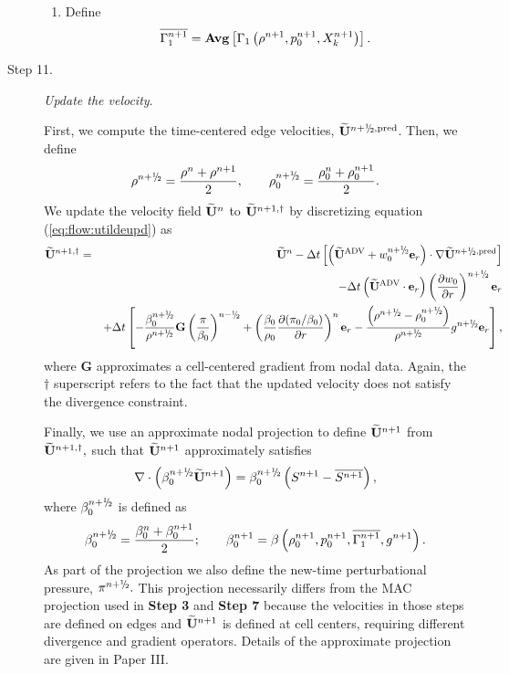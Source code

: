 \begin{description}
\begin{enumerate}
\item Define
\begin{equation}
\overline{\Gamma_1^{n+1}} = {\rm{\bf Avg}}\left[\Gamma_1\left(\rho^{n+1}, p_0^{n+1}, 
X_k^{n+1}\right) \right].
\end{equation}

\end{enumerate}


\item[Step 11.] {\em Update the velocity}.  

First, we compute the time-centered edge velocities, $\Ubt^{\nph,\pred}$.
Then, we define
\begin{equation}
\rho^\nph = \frac{\rho^n + \rho^{n+1}}{2}, \qquad \rho_0^\nph = \frac{\rho_0^n + \rho_0^{n+1}}{2}.
\end{equation}
We update the velocity field $\widetilde{{\bf U}}^n$ to $\widetilde{{\bf U}}^{n+1,\dagger}$ by discretizing 
equation (\ref{eq:flow:utildeupd}) as
\begin{eqnarray}
\Ubt^{n+1,\dagger} 
&=& \Ubt^n - \dt \left[\left(\uadvtwo+ w_0^{\nph} \eb_r\right) \cdot \nabla \Ubt^{\nph,\pred} \right] \nonumber \\
&&- \dt \left(\uadvtwo \cdot \eb_r\right)  \left(\frac{\partial w_0}{\partial r} \right)^\nph \eb_r \nonumber \\
&& + \dt \left[ - \frac{\beta_0^\nph}{\rho^\nph} \mathbf{G} \left ( \frac{\pi}{\beta_0}\right)^\nmh + \left(\frac{\beta_0}{\rho_0}\frac{\partial(\pi_0/\beta_0)}{\partial r}\right)^n \eb_r - \frac{\left(\rho^\nph-\rho_0^\nph\right)}{\rho^\nph} g^{\nph} \eb_r \right],\nonumber \\
\end{eqnarray}
where $\mathbf{G}$ approximates a cell-centered gradient from nodal
data.  Again, the $\dagger$ superscript refers 
to the fact that the updated velocity does not satisfy the divergence 
constraint.

Finally, we use an approximate nodal projection to define $\widetilde{{\bf U}}^{n+1}$
from $\widetilde{{\bf U}}^{n+1,\dagger},$  such that $\widetilde{{\bf U}}^{n+1}$ approximately
satisfies 
\begin{equation}
\nabla \cdot \left(\beta_0^{\nph} \Ubt^{n+1} \right) 
= \beta_0^{\nph} \left(S^{n+1} - \overline{S^{n+1}} \right),
\end{equation}
where $\beta_0^{\nph}$ is defined as
\begin{equation}
\beta_0^{\nph} = \frac{\beta_0^n + \beta_0^{n+1}}{2}; \qquad
\beta_0^{n+1} = \beta \left(\rho_0^{n+1}, p_0^{n+1}, \overline{\Gamma_1^{n+1}}, g^{n+1}\right).
\end{equation}
As part of the projection we also define the new-time perturbational pressure,
$\pi^\nph.$  This projection necessarily differs from the MAC projection used in 
{\bf Step 3} and {\bf Step 7} because the velocities in those steps are defined
on edges and $\widetilde{{\bf U}}^{n+1}$ is defined at cell centers, requiring different divergence
and gradient operators.  Details of the approximate projection are given in Paper III.


\end{description}
